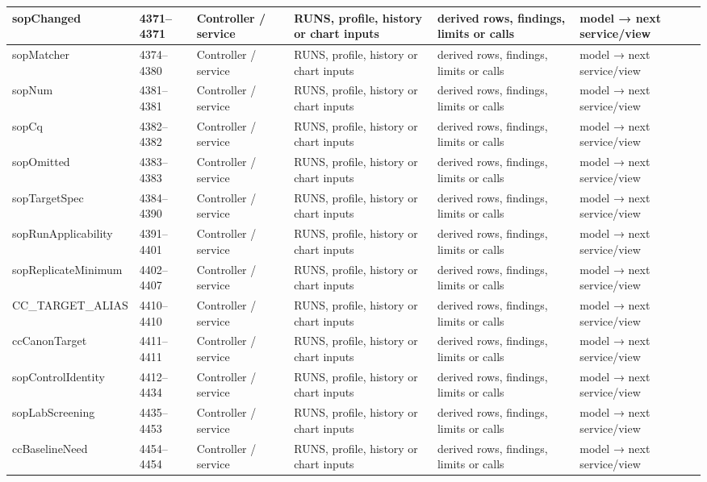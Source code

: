 \begin{landscape}
\begin{longtable}{@{}p{3.2cm}p{1.45cm}p{2.7cm}p{4.0cm}p{4.0cm}p{3.0cm}@{}}
sopChanged & 4371--4371 & Controller / service & RUNS, profile, history or chart inputs & derived rows, findings, limits or calls & model → next service/view \\\hline
sopMatcher & 4374--4380 & Controller / service & RUNS, profile, history or chart inputs & derived rows, findings, limits or calls & model → next service/view \\\hline
sopNum & 4381--4381 & Controller / service & RUNS, profile, history or chart inputs & derived rows, findings, limits or calls & model → next service/view \\\hline
sopCq & 4382--4382 & Controller / service & RUNS, profile, history or chart inputs & derived rows, findings, limits or calls & model → next service/view \\\hline
sopOmitted & 4383--4383 & Controller / service & RUNS, profile, history or chart inputs & derived rows, findings, limits or calls & model → next service/view \\\hline
sopTargetSpec & 4384--4390 & Controller / service & RUNS, profile, history or chart inputs & derived rows, findings, limits or calls & model → next service/view \\\hline
sopRunApplicability & 4391--4401 & Controller / service & RUNS, profile, history or chart inputs & derived rows, findings, limits or calls & model → next service/view \\\hline
sopReplicateMinimum & 4402--4407 & Controller / service & RUNS, profile, history or chart inputs & derived rows, findings, limits or calls & model → next service/view \\\hline
CC\_TARGET\_ALIAS & 4410--4410 & Controller / service & RUNS, profile, history or chart inputs & derived rows, findings, limits or calls & model → next service/view \\\hline
ccCanonTarget & 4411--4411 & Controller / service & RUNS, profile, history or chart inputs & derived rows, findings, limits or calls & model → next service/view \\\hline
sopControlIdentity & 4412--4434 & Controller / service & RUNS, profile, history or chart inputs & derived rows, findings, limits or calls & model → next service/view \\\hline
sopLabScreening & 4435--4453 & Controller / service & RUNS, profile, history or chart inputs & derived rows, findings, limits or calls & model → next service/view \\\hline
ccBaselineNeed & 4454--4454 & Controller / service & RUNS, profile, history or chart inputs & derived rows, findings, limits or calls & model → next service/view \\\hline

\end{longtable}
\end{landscape}
